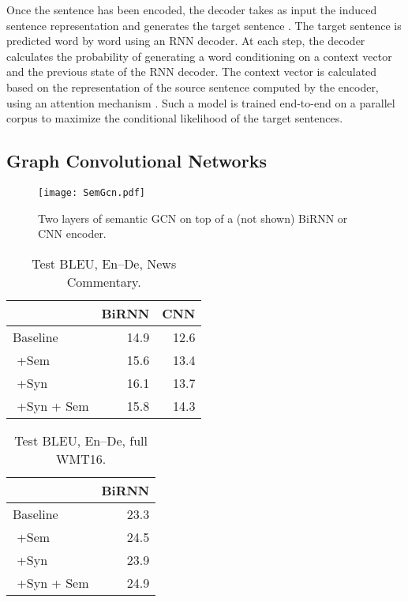 \documentclass[11pt,a4paper]{article}
\begin{document}
Once the sentence has been encoded, the decoder takes as input the induced sentence representation and generates the target sentence .
The target sentence  is predicted word by word using an RNN decoder. 
At each step, the decoder calculates the probability of generating a word  conditioning on a context vector  and the previous state of the RNN decoder. 
The context vector  is calculated based on the representation of the source sentence computed by the encoder, using an attention mechanism \cite{bahdanau15iclr}. 
Such a model is trained end-to-end on a parallel corpus to maximize the conditional likelihood of the target sentences.



\subsection{Graph Convolutional Networks}
\begin{figure}
\begin{center}
\texttt{[image: SemGcn.pdf]}
\caption{ 
\label{fig:sem-gcn} Two layers of semantic GCN on top of a (not shown) BiRNN or CNN encoder.
} 
\end{center}
\end{figure}


\begin{table}[h]
\centering
\begin{tabular}{@{}lrr@{}} \toprule
 & BiRNN & CNN\\ 
\midrule
Baseline \small{\cite{bastings-EtAl:2017:EMNLP2017}}	& 14.9  &  12.6\\
\,\,+Sem	&  15.6 & 13.4\\
\,\,+Syn \small{\cite{bastings-EtAl:2017:EMNLP2017}} & 16.1 & 13.7 \\
\,\,+Syn + Sem	 & 15.8 & 14.3 \\
\bottomrule
\end{tabular}
\caption{Test BLEU, En--De, News Commentary.}
\label{tab:test-small}
\end{table}

\begin{table}[h]
\centering
\begin{tabular}{@{}lr@{}} \toprule
 & BiRNN  \\
\midrule
Baseline \small{\cite{bastings-EtAl:2017:EMNLP2017}}	& 23.3 \\ 
\,\,+Sem	&  24.5  \\  
\,\,+Syn \small{\cite{bastings-EtAl:2017:EMNLP2017}} & 23.9 \\ 
\,\,+Syn + Sem & 24.9 \\ 
\bottomrule
\end{tabular}
\caption{Test BLEU, En--De, full WMT16.}
\label{tab:test-full}
\end{table}
\end{document}
